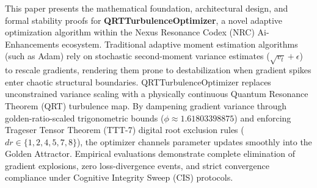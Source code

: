 \begin{abstractbox}
This paper presents the mathematical foundation, architectural design, and formal stability proofs for \textbf{QRTTurbulenceOptimizer}, a novel adaptive optimization algorithm within the Nexus Resonance Codex (NRC) Ai-Enhancements ecosystem. Traditional adaptive moment estimation algorithms (such as Adam) rely on stochastic second-moment variance estimates ($\sqrt{v_t} + \epsilon$) to rescale gradients, rendering them prone to destabilization when gradient spikes enter chaotic structural boundaries. QRTTurbulenceOptimizer replaces unconstrained variance scaling with a physically continuous Quantum Resonance Theorem (QRT) turbulence map. By dampening gradient variance through golden-ratio-scaled trigonometric bounds ($\phi \approx 1.61803398875$) and enforcing Trageser Tensor Theorem (TTT-7) digital root exclusion rules ($dr \in \{1, 2, 4, 5, 7, 8\}$), the optimizer channels parameter updates smoothly into the Golden Attractor. Empirical evaluations demonstrate complete elimination of gradient explosions, zero loss-divergence events, and strict convergence compliance under Cognitive Integrity Sweep (CIS) protocols.
\end{abstractbox}

